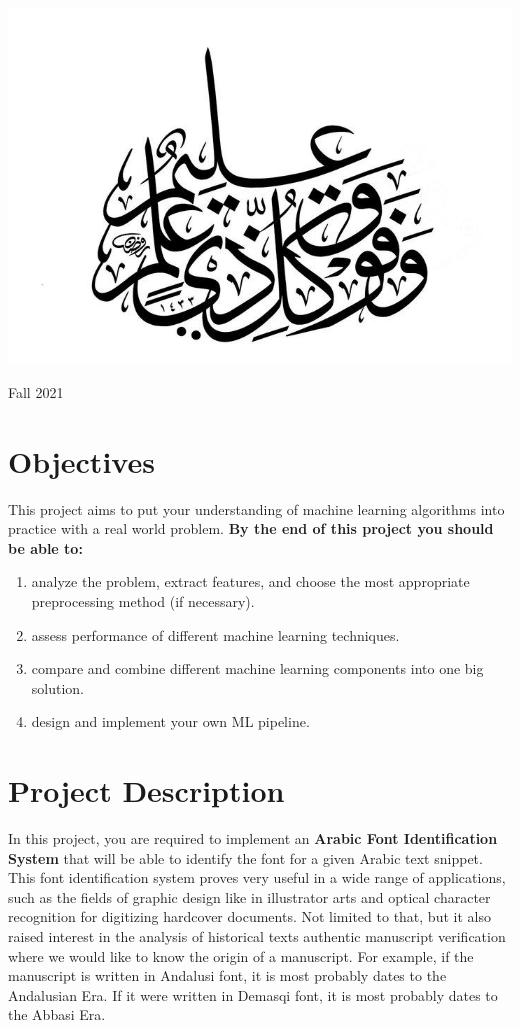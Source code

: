 \documentclass[12pt]{article}
\begin{document}
\begin{center}
\includegraphics[scale=2]{intro.jpg}
\end{center}
\begin{center}
    \large{Fall 2021}
\end{center}
\newpage
\tableofcontents

\newpage
\section{Objectives}
This project aims to put your understanding of machine learning algorithms into practice with a real world problem. \textbf{By the end of this project you should be able to:}
\begin{enumerate}
    \item analyze the problem, extract features, and choose the most appropriate preprocessing method (if necessary).
    \item assess performance of different machine learning techniques.
    \item compare and combine different machine learning components into one big solution.
    \item design and implement your own ML pipeline.
\end{enumerate}

\section{Project Description}
In this project, you are required to implement an \textbf{Arabic Font Identification System} that will be able to identify the font for a given Arabic text snippet. This font identification system proves very useful in a wide range of applications, such as the fields of graphic design like in illustrator arts and optical character recognition for digitizing hardcover documents. Not limited to that, but it also raised interest in the analysis of historical texts authentic manuscript verification where we would like to know the origin of a manuscript. For example, if the manuscript is written in Andalusi font, it is most probably dates to the Andalusian Era. If it were written in Demasqi font, it is most probably dates to the Abbasi Era. 
\\
\end{document}
